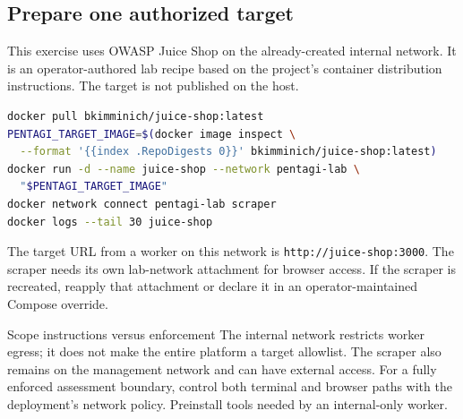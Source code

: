 \documentclass[11pt,letterpaper]{article}
\newcommand{\code}[1]{\nolinkurl{#1}}
\newcommand{\src}[1]{\cite{#1}}
\begin{document}
\subsection{Prepare one authorized target}
This exercise uses OWASP Juice Shop on the already-created internal network.
It is an operator-authored lab recipe based on the project's container
distribution instructions. The target is not published on the host.
\src{juice}
\begin{lstlisting}[language=bash]
docker pull bkimminich/juice-shop:latest
PENTAGI_TARGET_IMAGE=$(docker image inspect \
  --format '{{index .RepoDigests 0}}' bkimminich/juice-shop:latest)
docker run -d --name juice-shop --network pentagi-lab \
  "$PENTAGI_TARGET_IMAGE"
docker network connect pentagi-lab scraper
docker logs --tail 30 juice-shop
\end{lstlisting}
The target URL from a worker on this network is
\code{http://juice-shop:3000}. The scraper needs its own lab-network attachment
for browser access. If the scraper is recreated, reapply that attachment or
declare it in an operator-maintained Compose override.

\begin{panel}{Scope instructions versus enforcement}
The internal network restricts worker egress; it does not make the entire
platform a target allowlist. The scraper also remains on the management network
and can have external access. For a fully enforced assessment boundary, control
both terminal and browser paths with the deployment's network policy.
Preinstall tools needed by an internal-only worker. \src{network,compose,docker-code}
\end{panel}
\end{document}
